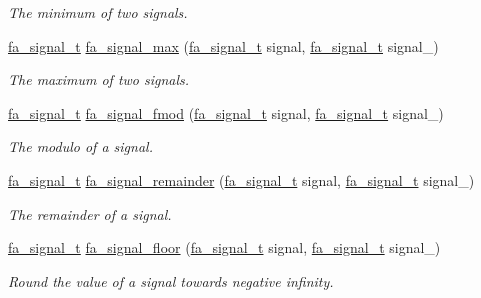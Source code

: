 \begin{DoxyCompactItemize}
\begin{DoxyCompactList}\small\item\em The minimum of two signals. \end{DoxyCompactList}\item 
\hyperlink{group___fa_signal_gac5c72f160cd6e93a6783551627b166e5}{fa\-\_\-signal\-\_\-t} \hyperlink{group___fa_signal_ga2538b9517e92a0cb7b8240f7f2c9e301}{fa\-\_\-signal\-\_\-max} (\hyperlink{group___fa_signal_gac5c72f160cd6e93a6783551627b166e5}{fa\-\_\-signal\-\_\-t} signal, \hyperlink{group___fa_signal_gac5c72f160cd6e93a6783551627b166e5}{fa\-\_\-signal\-\_\-t} signal\-\_\-)
\begin{DoxyCompactList}\small\item\em The maximum of two signals. \end{DoxyCompactList}\item 
\hyperlink{group___fa_signal_gac5c72f160cd6e93a6783551627b166e5}{fa\-\_\-signal\-\_\-t} \hyperlink{group___fa_signal_ga3831c1e01675c8405f359c6aedaa034a}{fa\-\_\-signal\-\_\-fmod} (\hyperlink{group___fa_signal_gac5c72f160cd6e93a6783551627b166e5}{fa\-\_\-signal\-\_\-t} signal, \hyperlink{group___fa_signal_gac5c72f160cd6e93a6783551627b166e5}{fa\-\_\-signal\-\_\-t} signal\-\_\-)
\begin{DoxyCompactList}\small\item\em The modulo of a signal. \end{DoxyCompactList}\item 
\hyperlink{group___fa_signal_gac5c72f160cd6e93a6783551627b166e5}{fa\-\_\-signal\-\_\-t} \hyperlink{group___fa_signal_ga4367b86ae83b65ca98f8aa1d6be93687}{fa\-\_\-signal\-\_\-remainder} (\hyperlink{group___fa_signal_gac5c72f160cd6e93a6783551627b166e5}{fa\-\_\-signal\-\_\-t} signal, \hyperlink{group___fa_signal_gac5c72f160cd6e93a6783551627b166e5}{fa\-\_\-signal\-\_\-t} signal\-\_\-)
\begin{DoxyCompactList}\small\item\em The remainder of a signal. \end{DoxyCompactList}\item 
\hyperlink{group___fa_signal_gac5c72f160cd6e93a6783551627b166e5}{fa\-\_\-signal\-\_\-t} \hyperlink{group___fa_signal_gabf64fa29f76997c8231283d1af09d633}{fa\-\_\-signal\-\_\-floor} (\hyperlink{group___fa_signal_gac5c72f160cd6e93a6783551627b166e5}{fa\-\_\-signal\-\_\-t} signal, \hyperlink{group___fa_signal_gac5c72f160cd6e93a6783551627b166e5}{fa\-\_\-signal\-\_\-t} signal\-\_\-)
\begin{DoxyCompactList}\small\item\em Round the value of a signal towards negative infinity. \end{DoxyCompactList}\item 

\end{DoxyCompactItemize}
